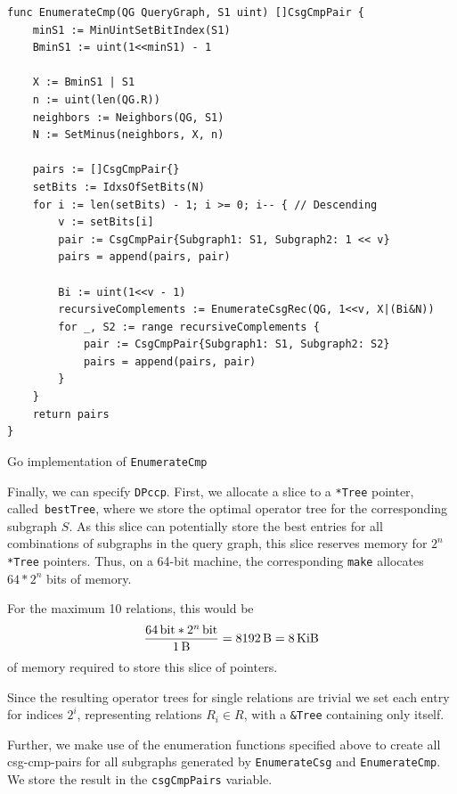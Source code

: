 \begin{algorithm}[H]
\begin{verbatim}
func EnumerateCmp(QG QueryGraph, S1 uint) []CsgCmpPair {
    minS1 := MinUintSetBitIndex(S1)
    BminS1 := uint(1<<minS1) - 1

    X := BminS1 | S1
    n := uint(len(QG.R))
    neighbors := Neighbors(QG, S1)
    N := SetMinus(neighbors, X, n)

    pairs := []CsgCmpPair{}
    setBits := IdxsOfSetBits(N)
    for i := len(setBits) - 1; i >= 0; i-- { // Descending
        v := setBits[i]
        pair := CsgCmpPair{Subgraph1: S1, Subgraph2: 1 << v}
        pairs = append(pairs, pair)

        Bi := uint(1<<v - 1)
        recursiveComplements := EnumerateCsgRec(QG, 1<<v, X|(Bi&N))
        for _, S2 := range recursiveComplements {
            pair := CsgCmpPair{Subgraph1: S1, Subgraph2: S2}
            pairs = append(pairs, pair)
        }
    }
    return pairs
}
\end{verbatim}
\caption{Go implementation of \texttt{EnumerateCmp}}
\label{alg:enumeratecmp}
\end{algorithm}
\newpage

Finally, we can specify \texttt{DPccp}. 
First, we allocate a slice to a \texttt{*Tree} pointer, called \texttt{bestTree}, where we store the optimal operator tree for the corresponding subgraph $S$. As this slice can potentially store the best entries for all combinations of subgraphs in the query graph, this slice reserves memory for $2^n$ \texttt{*Tree} pointers. Thus, on a 64-bit machine, the corresponding \texttt{make} allocates $64 * 2^n$ bits of memory.

\begin{example}
For the maximum 10 relations, this would be 
\begin{equation}
\frac{\SI{64}{\bit} * \SI[parse-numbers = false]{2^n}{\bit}}{\SI{1}{\byte}} = \SI{8192}{\byte} = \SI{8}{\kibi\byte}
\end{equation}
of memory required to store this slice of pointers.
\end{example}

Since the resulting operator trees for single relations are trivial we set each entry for indices $2^i$, representing relations $R_i \in R$, with a \texttt{\&Tree} containing only itself. 

Further, we make use of the enumeration functions specified above to create all csg-cmp-pairs for all subgraphs generated by \texttt{EnumerateCsg} and \texttt{EnumerateCmp}. We store the result in the \texttt{csgCmpPairs} variable.

